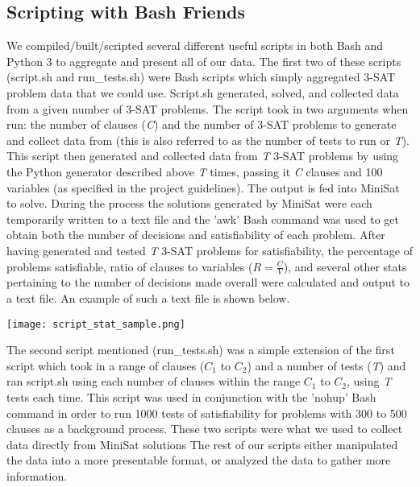 \documentclass{eptcs}
\begin{document}
\subsection*{Scripting with Bash Friends}
We compiled/built/scripted several different useful scripts in both Bash and Python 3 to aggregate and present all of our data. The first two of these scripts (script.sh and run\_tests.sh) were Bash scripts which simply aggregated 3-SAT problem data that we could use.
Script.sh generated, solved, and collected data from a given number of 3-SAT problems. The script took in two arguments when run: the number of clauses (\textit{C}) and the number of 3-SAT problems to generate and collect data from (this is also referred to as the number of tests to run or \textit{T}). This script then generated and collected data from \textit{T} 3-SAT problems by using the Python generator described above \textit{T} times, passing it \textit{C} clauses and 100 variables (as specified in the project guidelines). The output is fed into MiniSat to solve. During the process the solutions generated by MiniSat were each temporarily written to a text file and the 'awk' Bash command was used to get obtain both the number of decisions and satisfiability of each problem. After having generated and tested \textit{T} 3-SAT problems for satisfiability, the percentage of problems satisfiable, ratio of clauses to variables ($R=\frac{C}{V}$), and several other stats pertaining to the number of decisions made overall were calculated and output to a text file. An example of such a text file is shown below.
\begin{center}
	\centering
	\texttt{[image: script\_stat\_sample.png]}
\end{center}
The second script mentioned (run\_tests.sh) was a simple extension of the first script which took in a range of clauses (\textit{$C_1$} to \textit{$C_2$}) and a number of tests (\textit{T}) and ran script.sh using each number of clauses within the range \textit{$C_1$} to \textit{$C_2$}, using \textit{T} tests each time. This script was used in conjunction with the 'nohup' Bash command in order to run 1000 tests of satisfiability for problems with 300 to 500 clauses as a background process. These two scripts were what we used to collect data directly from MiniSat solutions The rest of our scripts either manipulated the data into a more presentable format, or analyzed the data to gather more information.
\end{document}
